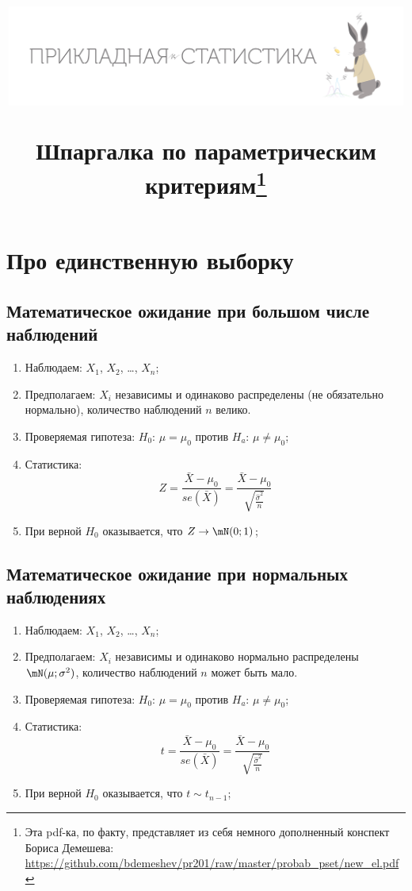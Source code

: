 \documentclass[12pt, a4paper, oneside]{article}
\title{\begin{center} \includegraphics[width=0.99\textwidth]{logo.png} \end{center} Шпаргалка по параметрическим критериям\footnote{Эта pdf-ка, по факту, представляет из себя немного дополненный конспект Бориса Демешева:  \url{https://github.com/bdemeshev/pr201/raw/master/probab_pset/new_el.pdf}}}
\date{ } %
\begin{document}

\maketitle

\section{Про единственную выборку}

\subsection*{Математическое ожидание при большом числе наблюдений}

\begin{enumerate}
    \item Наблюдаем: $X_1$, $X_2$, \ldots, $X_n$;
    
    \item Предполагаем: $X_i$ независимы и одинаково распределены (не обязательно нормально), количество наблюдений $n$ велико.
    
    \item Проверяемая гипотеза: $H_0$: $\mu = \mu_0$ против $H_a$: $\mu \neq \mu_0$;
    
    \item Статистика:
    \[
    Z = \frac{\bar X - \mu_0}{se(\bar X)} = \frac{\bar X - \mu_0}{\sqrt{\frac{\hat \sigma^2}{n}}}
    \]
    
    \item При верной $H_0$ оказывается, что $Z \to \mN(0;1)$;
\end{enumerate}


\subsection*{Математическое ожидание при нормальных наблюдениях}

\begin{enumerate}
    \item Наблюдаем: $X_1$, $X_2$, \ldots, $X_n$;
    
    \item Предполагаем: $X_i$ независимы и одинаково нормально распределены $\mN(\mu; \sigma^2)$, количество наблюдений $n$ может быть мало.
    
    \item Проверяемая гипотеза: $H_0$: $\mu = \mu_0$ против $H_a$: $\mu \neq \mu_0$;
    
    \item Статистика:
    \[
    t = \frac{\bar X - \mu_0}{se(\bar X)} = \frac{\bar X - \mu_0}{\sqrt{\frac{\hat \sigma^2}{n}}}
    \]
    
    \item При верной $H_0$ оказывается, что $t \sim t_{n-1}$;
\end{enumerate}
\end{document}
